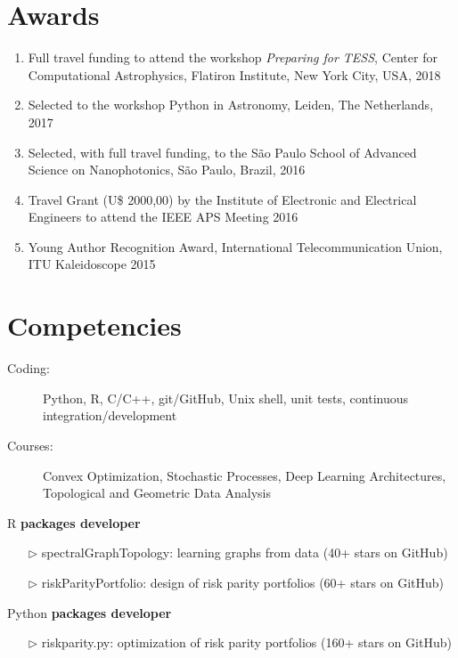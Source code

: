 \documentclass[10pt]{article}
\begin{document}
\begin{titlepage}
\section*{Awards}
\begin{enumerate}
  \item Full travel funding to attend the workshop \textit{Preparing for TESS}, Center for Computational Astrophysics, Flatiron Institute, New York City, USA, 2018
  \item Selected to the workshop \textsf{Python} in Astronomy, Leiden, The Netherlands, 2017
  \item Selected, with full travel funding, to the S\~ao Paulo School of Advanced Science on Nanophotonics, S\~ao Paulo, Brazil, 2016
  \item Travel Grant (U\$ 2000,00) by the Institute of Electronic and Electrical Engineers to attend the IEEE APS Meeting 2016
  \item Young Author Recognition Award, International Telecommunication Union, ITU Kaleidoscope 2015
\end{enumerate}


\section*{Competencies}
\begin{description}
  \item[Coding:] \textsf{Python}, \textsf{R}, \textsf{C/C++}, git/GitHub, Unix shell, unit tests, continuous integration/development
  \item[Courses:] Convex Optimization, Stochastic Processes, Deep Learning Architectures, Topological and Geometric Data Analysis
\end{description}

\begin{multicols}{2}
  \textsf{R} \textbf{packages developer}
  \begin{itemize}
    \item[$\triangleright$] \textsf{spectralGraphTopology}: learning graphs from data (40+ stars on GitHub)
    \item[$\triangleright$] \textsf{riskParityPortfolio}: design of risk parity portfolios (60+ stars on GitHub)
  \end{itemize}

\columnbreak
  \textsf{Python} \textbf{packages developer}
      \begin{itemize}
        \item[$\triangleright$] \textsf{riskparity.py}: optimization of risk parity portfolios (160+ stars on GitHub)
      \end{itemize}
\end{multicols}

\end{titlepage}
\end{document}
